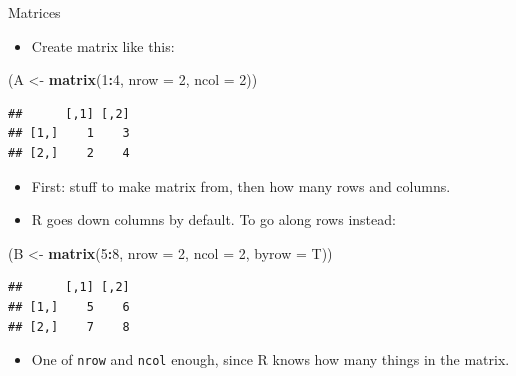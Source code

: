 \documentclass[
  ignorenonframetext,
]{beamer}
\newenvironment{Shaded}{\begin{snugshade}}{\end{snugshade}}
\newcommand{\DataTypeTok}[1]{\textcolor[rgb]{0.13,0.29,0.53}{#1}}
\newcommand{\DecValTok}[1]{\textcolor[rgb]{0.00,0.00,0.81}{#1}}
\newcommand{\KeywordTok}[1]{\textcolor[rgb]{0.13,0.29,0.53}{\textbf{#1}}}
\newcommand{\NormalTok}[1]{#1}
\newcommand{\OperatorTok}[1]{\textcolor[rgb]{0.81,0.36,0.00}{\textbf{#1}}}
\newcommand{\StringTok}[1]{\textcolor[rgb]{0.31,0.60,0.02}{#1}}
\providecommand{\tightlist}{%
  \setlength{\itemsep}{0pt}\setlength{\parskip}{0pt}}
\begin{document}
\begin{frame}[fragile]{Matrices}
\protect\hypertarget{matrices}{}

\begin{itemize}
\tightlist
\item
  Create matrix like this:
\end{itemize}

\begin{Shaded}
\begin{Highlighting}[]
\NormalTok{(A <-}\StringTok{ }\KeywordTok{matrix}\NormalTok{(}\DecValTok{1}\OperatorTok{:}\DecValTok{4}\NormalTok{, }\DataTypeTok{nrow =} \DecValTok{2}\NormalTok{, }\DataTypeTok{ncol =} \DecValTok{2}\NormalTok{))}
\end{Highlighting}
\end{Shaded}

\begin{verbatim}
##      [,1] [,2]
## [1,]    1    3
## [2,]    2    4
\end{verbatim}

\begin{itemize}
\tightlist
\item
  First: stuff to make matrix from, then how many rows and columns.
\item
  R goes down columns by default. To go along rows instead:
\end{itemize}

\begin{Shaded}
\begin{Highlighting}[]
\NormalTok{(B <-}\StringTok{ }\KeywordTok{matrix}\NormalTok{(}\DecValTok{5}\OperatorTok{:}\DecValTok{8}\NormalTok{, }\DataTypeTok{nrow =} \DecValTok{2}\NormalTok{, }\DataTypeTok{ncol =} \DecValTok{2}\NormalTok{, }\DataTypeTok{byrow =}\NormalTok{ T))}
\end{Highlighting}
\end{Shaded}

\begin{verbatim}
##      [,1] [,2]
## [1,]    5    6
## [2,]    7    8
\end{verbatim}

\begin{itemize}
\tightlist
\item
  One of \texttt{nrow} and \texttt{ncol} enough, since R knows how many
  things in the matrix.
\end{itemize}

\end{frame}
\end{document}
